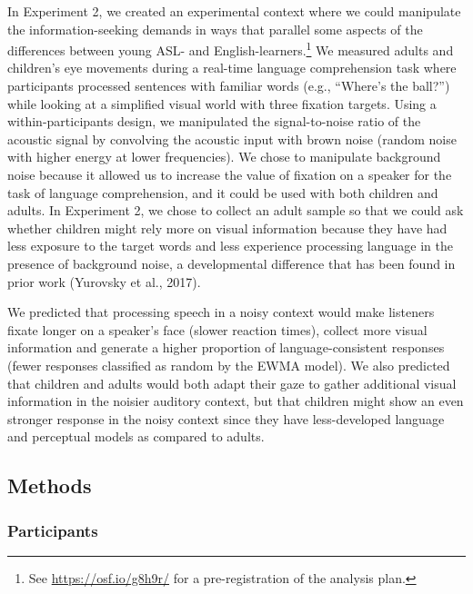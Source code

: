 \documentclass[,man,floatsintext]{apa6}
\let\rmarkdownfootnote\footnote%
\def\footnote{\protect\rmarkdownfootnote}
\begin{document}
In Experiment 2, we created an experimental context where we could manipulate the information-seeking demands in ways that parallel some aspects of the differences between young ASL- and English-learners.\footnote{See \url{https://osf.io/g8h9r/} for a pre-registration of the analysis plan.} We measured adults and children's eye movements during a real-time language comprehension task where participants processed sentences with familiar words (e.g., \enquote{Where's the ball?}) while looking at a simplified visual world with three fixation targets. Using a within-participants design, we manipulated the signal-to-noise ratio of the acoustic signal by convolving the acoustic input with brown noise (random noise with higher energy at lower frequencies). We chose to manipulate background noise because it allowed us to increase the value of fixation on a speaker for the task of language comprehension, and it could be used with both children and adults. In Experiment 2, we chose to collect an adult sample so that we could ask whether children might rely more on visual information because they have had less exposure to the target words and less experience processing language in the presence of background noise, a developmental difference that has been found in prior work (Yurovsky et al., 2017).

We predicted that processing speech in a noisy context would make listeners fixate longer on a speaker's face (slower reaction times), collect more visual information and generate a higher proportion of language-consistent responses (fewer responses classified as random by the EWMA model). We also predicted that children and adults would both adapt their gaze to gather additional visual information in the noisier auditory context, but that children might show an even stronger response in the noisy context since they have less-developed language and perceptual models as compared to adults.

\hypertarget{methods-1}{%
\subsection{Methods}\label{methods-1}}

\hypertarget{participants-1}{%
\subsubsection{Participants}\label{participants-1}}
\end{document}

